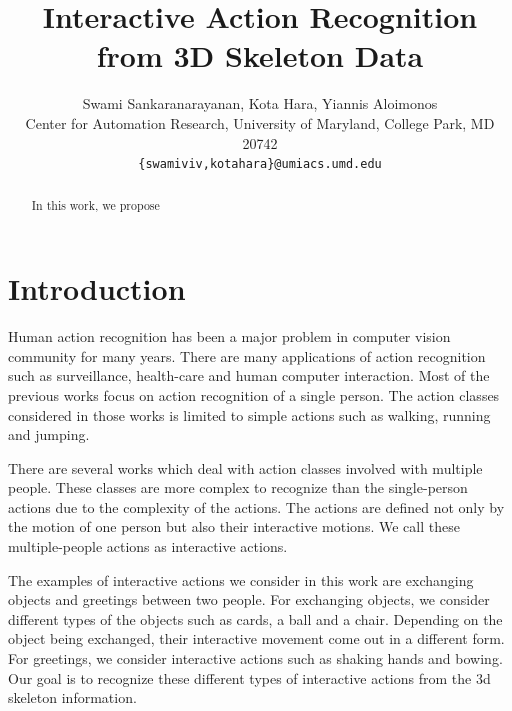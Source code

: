\documentclass[10pt,twocolumn,letterpaper]{article}
\begin{document}
\title{Interactive Action Recognition from 3D Skeleton Data}

\author{Swami Sankaranarayanan, Kota Hara, Yiannis Aloimonos\\
Center for Automation Research, University of Maryland, College Park, MD 20742\\
{\tt\small \{swamiviv,kotahara\}@umiacs.umd.edu}
}


\maketitle

\begin{abstract}
In this work, we propose 
   
\end{abstract}

\section{Introduction}
Human action recognition has been a major problem in computer vision community for many years. There are many applications of action recognition such as surveillance, health-care and human computer interaction. Most of the previous works focus on action recognition of a single person. The action classes considered in those works is limited to simple actions such as walking, running and jumping. 

There are several works which deal with action classes involved with multiple people. These classes are more complex to recognize than the single-person actions due to the complexity of the actions. The actions are defined not only by the motion of one person but also their interactive motions. We call these multiple-people actions as interactive actions.

The examples of interactive actions we consider in this work are exchanging objects and greetings between two people. For exchanging objects, we consider different types of the objects such as cards, a ball and a chair. Depending on the object being exchanged, their interactive movement come out in a different form. For greetings, we consider interactive actions such as shaking hands and bowing. Our goal is to recognize these different types of interactive actions from the 3d skeleton information.
\end{document}
